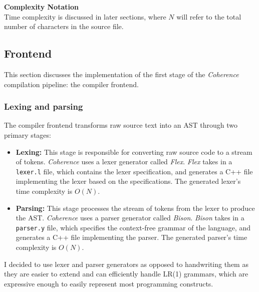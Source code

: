 \documentclass[a4paper,12pt,fleqn]{article}
\begin{document}
\begin{notebox}
\textbf{Complexity Notation} \\
Time complexity is discussed in later sections, where $N$ will refer to the total number of characters in the source file.
\end{notebox}
\subsection{Frontend} \label{sec:frontend}
This section discusses the implementation of the first stage of the \textit{Coherence} compilation pipeline: the compiler frontend.
\subsubsection{Lexing and parsing}
The compiler frontend transforms raw source text into an AST through two primary stages:
\begin{itemize}
  \item \textbf{Lexing:} This stage is responsible for converting raw source code to a stream of tokens. \textit{Coherence} uses a lexer generator called \textit{Flex}. \textit{Flex} takes in a \texttt{lexer.l} file, which contains the lexer specification, and generates a C++ file implementing the lexer based on the specifications. The generated lexer's time complexity is $O(N)$.
  \item \textbf{Parsing:} This stage processes the stream of tokens from the lexer to produce the AST. \textit{Coherence} uses a parser generator called \textit{Bison}. \textit{Bison} takes in a \texttt{parser.y} file, which specifies the context-free grammar of the language, and generates a C++ file implementing the parser. The generated parser's time complexity is $O(N)$.
\end{itemize}
I decided to use lexer and parser generators as opposed to handwriting them as they are easier to extend and can efficiently handle LR(1) grammars, which are expressive enough to easily represent most programming constructs.
\end{document}
